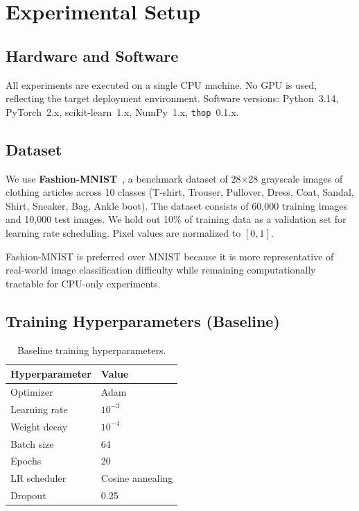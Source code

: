 \section{Experimental Setup}
\label{sec:setup}

\subsection{Hardware and Software}

All experiments are executed on a single CPU machine.
No GPU is used, reflecting the target deployment environment.
Software versions: Python~3.14, PyTorch~2.x, scikit-learn~1.x,
NumPy~1.x, \texttt{thop}~0.1.x.

\subsection{Dataset}

We use \textbf{Fashion-MNIST}~\citep{xiao2017fashion}, a benchmark dataset
of 28$\times$28 grayscale images of clothing articles across 10 classes
(T-shirt, Trouser, Pullover, Dress, Coat, Sandal, Shirt, Sneaker, Bag,
Ankle boot).
The dataset consists of 60{,}000 training images and 10{,}000 test images.
We hold out 10\% of training data as a validation set for
learning rate scheduling.
Pixel values are normalized to $[0,1]$.

Fashion-MNIST is preferred over MNIST because it is more
representative of real-world image classification difficulty while
remaining computationally tractable for CPU-only experiments.

\subsection{Training Hyperparameters (Baseline)}

\begin{table}[h]
\centering
\caption{Baseline training hyperparameters.}
\label{tab:hyperparams}
\small
\begin{tabular}{ll}
\toprule
Hyperparameter & Value \\
\midrule
Optimizer      & Adam~\citep{kingma2014adam} \\
Learning rate  & $10^{-3}$ \\
Weight decay   & $10^{-4}$ \\
Batch size     & 64 \\
Epochs         & 20 \\
LR scheduler   & Cosine annealing \\
Dropout        & 0.25 \\
\bottomrule
\end{tabular}
\end{table}

